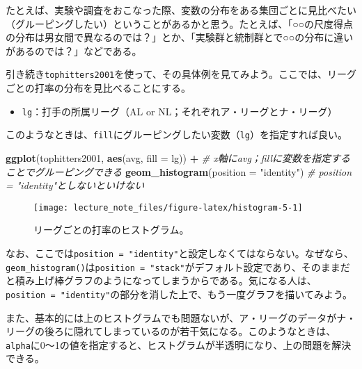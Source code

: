 \documentclass[]{book}
\newenvironment{Shaded}{\begin{snugshade}}{\end{snugshade}}
\newcommand{\KeywordTok}[1]{\textcolor[rgb]{0.13,0.29,0.53}{\textbf{#1}}}
\newcommand{\DataTypeTok}[1]{\textcolor[rgb]{0.13,0.29,0.53}{#1}}
\newcommand{\StringTok}[1]{\textcolor[rgb]{0.31,0.60,0.02}{#1}}
\newcommand{\CommentTok}[1]{\textcolor[rgb]{0.56,0.35,0.01}{\textit{#1}}}
\newcommand{\OperatorTok}[1]{\textcolor[rgb]{0.81,0.36,0.00}{\textbf{#1}}}
\newcommand{\NormalTok}[1]{#1}
\providecommand{\tightlist}{%
  \setlength{\itemsep}{0pt}\setlength{\parskip}{0pt}}
\begin{document}
たとえば、実験や調査をおこなった際、変数の分布をある集団ごとに見比べたい（グルーピングしたい）ということがあるかと思う。たとえば、「○○の尺度得点の分布は男女間で異なるのでは？」とか、「実験群と統制群とで○○の分布に違いがあるのでは？」などである。

引き続き\texttt{tophitters2001}を使って、その具体例を見てみよう。ここでは、リーグごとの打率の分布を見比べることにする。

\begin{itemize}
\tightlist
\item
  \texttt{lg}：打手の所属リーグ（AL or
  NL；それぞれア・リーグとナ・リーグ）
\end{itemize}

このようなときは、\texttt{fill}にグルーピングしたい変数（\texttt{lg}）を指定すれば良い。



\begin{Shaded}
\begin{Highlighting}[]
\KeywordTok{ggplot}\NormalTok{(tophitters2001, }\KeywordTok{aes}\NormalTok{(avg, }\DataTypeTok{fill =}\NormalTok{ lg)) }\OperatorTok{+}\StringTok{ }\CommentTok{# x軸にavg；fillに変数を指定することでグルーピングできる}
\StringTok{  }\KeywordTok{geom_histogram}\NormalTok{(}\DataTypeTok{position =} \StringTok{"identity"}\NormalTok{) }\CommentTok{# position = "identity"としないといけない}
\end{Highlighting}
\end{Shaded}

\begin{figure}

{\centering \texttt{[image: lecture\_note\_files/figure-latex/histogram-5-1]} 

}

\caption{リーグごとの打率のヒストグラム。}\label{fig:histogram-5}
\end{figure}

なお、ここでは\texttt{position\ =\ "identity"}と設定しなくてはならない。なぜなら、\texttt{geom\_histogram()}は\texttt{position\ =\ "stack"}がデフォルト設定であり、そのままだと積み上げ棒グラフのようになってしまうからである。気になる人は、\texttt{position\ =\ "identity"}の部分を消した上で、もう一度グラフを描いてみよう。

また、基本的には上のヒストグラムでも問題ないが、ア・リーグのデータがナ・リーグの後ろに隠れてしまっているのが若干気になる。このようなときは、\texttt{alpha}に0〜1の値を指定すると、ヒストグラムが半透明になり、上の問題を解決できる。
\end{document}
